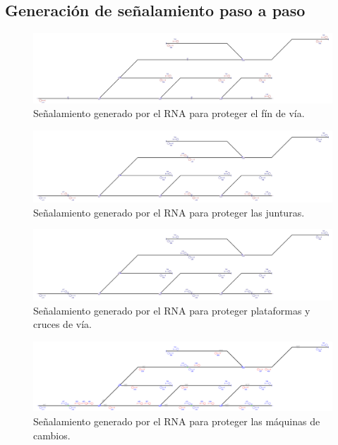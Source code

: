 \subsection{Generación de señalamiento paso a paso}

\lipsum[1]

\begin{figure}[H]
	\centering
	\includegraphics[width=1\textwidth]{resultados-obtenidos/ejemplo6/images/6_step1.png}
	\centering\caption{Señalamiento generado por el RNA para proteger el fín de vía.}
\end{figure}

\lipsum[1]

\begin{figure}[H]
	\centering
	\includegraphics[width=1\textwidth]{resultados-obtenidos/ejemplo6/images/6_step2.png}
	\centering\caption{Señalamiento generado por el RNA para proteger las junturas.}
\end{figure}

\lipsum[1]

\begin{figure}[H]
	\centering
	\includegraphics[width=1\textwidth]{resultados-obtenidos/ejemplo6/images/6_step3.png}
	\centering\caption{Señalamiento generado por el RNA para proteger plataformas y cruces de vía.}
\end{figure}

\lipsum[1]

 \begin{figure}[H]
	\centering
	\includegraphics[width=1\textwidth]{resultados-obtenidos/ejemplo6/images/6_step4.png}
	\centering\caption{Señalamiento generado por el RNA para proteger las máquinas de cambios.}
\end{figure}

